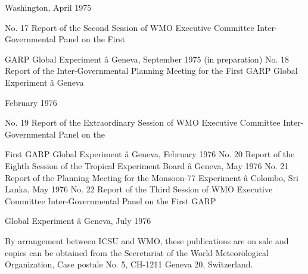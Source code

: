 Washington, April 1975

No. 17 Report of the Second Session of WMO Executive Committee
Inter-Governmental Panel on the First

GARP Global Experiment â Geneva, September 1975 (in preparation) No. 18
Report of the Inter-Governmental Planning Meeting for the First GARP
Global Experiment â Geneva

February 1976

No. 19 Report of the Extraordinary Session of WMO Executive Committee
Inter-Governmental Panel on the

First GARP Global Experiment â Geneva, February 1976 No. 20 Report of
the Eighth Session of the Tropical Experiment Board â Geneva, May 1976
No. 21 Report of the Planning Meeting for the Monsoon-77 Experiment â
Colombo, Sri Lanka, May 1976 No. 22 Report of the Third Session of WMO
Executive Committee Inter-Governmental Panel on the First GARP

Global Experiment â Geneva, July 1976

By arrangement between ICSU and WMO, these publications are on sale and
copies can be obtained from the Secretariat of the World Meteorological
Organization, Case postale No. 5, CH-1211 Geneva 20, Switzerland.
